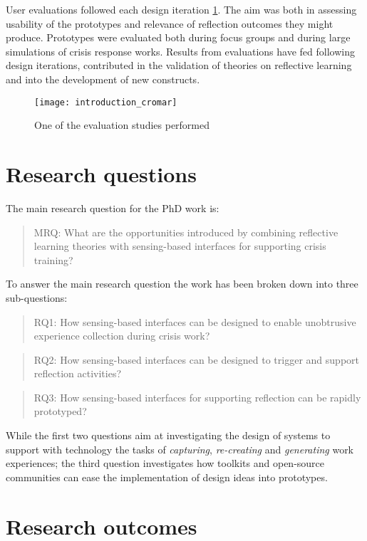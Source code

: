 User evaluations followed each design iteration \ref{fig:cromar}. The aim was both in assessing usability of the prototypes and relevance of reflection outcomes they might produce. Prototypes were evaluated both during focus groups and during large simulations of crisis response works. Results from evaluations have fed following design iterations, contributed in the validation of theories on reflective learning and into the development of new constructs.
\begin{figure}
	[tbh] \centering 
	\texttt{[image: introduction\_cromar]} \caption{One of the evaluation studies performed} \label{fig:cromar} 
\end{figure}

\section{Research questions}\label{research-questions}

The main research question for the PhD work is:
\begin{quote}
	MRQ: What are the opportunities introduced by combining reflective learning theories with sensing-based interfaces for supporting crisis training? 
\end{quote}

To answer the main research question the work has been broken down into three sub-questions:
\begin{quote}
	RQ1: How sensing-based interfaces can be designed to enable unobtrusive experience collection during crisis work? 
\end{quote}
\begin{quote}
	RQ2: How sensing-based interfaces can be designed to trigger and support reflection activities? 
\end{quote}
\begin{quote}
	RQ3: How sensing-based interfaces for supporting reflection can be rapidly prototyped? 
\end{quote}

While the first two questions aim at investigating the design of systems to support with technology the tasks of \emph{capturing}, \emph{re-creating} and \emph{generating} work experiences; the third question investigates how toolkits and open-source communities can ease the implementation of design ideas into prototypes.

\section{Research outcomes}\label{research-outcomes}

